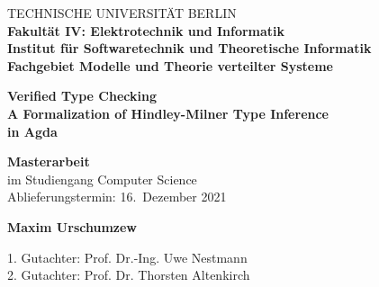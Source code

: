 \begin{titlepage}
%
\vspace*{1em}

\begin{center}%
\large {%
	TECHNISCHE UNIVERSITÄT BERLIN\\ 
  \vspace{0.5cm}
  \textbf{Fakultät IV: Elektrotechnik und Informatik}\\
	\textbf{Institut für Softwaretechnik und Theoretische Informatik}\\
	\textbf{Fachgebiet Modelle und Theorie verteilter Systeme}\\
}
\end{center}
\hfill

%
\vspace*{0.07\textheight}
%
\begin{center}
\huge { \textbf{Verified Type Checking} }\\
\vspace{0.8cm}
\Large{\textbf{A Formalization of Hindley-Milner Type Inference \\ in Agda}}
\end{center}
%
\vspace*{0.07\textheight}
%
\begin{center}
	\LARGE { \textbf{Masterarbeit} }\\
	\vspace*{1em}
	\Large im Studiengang Computer Science \\
  Ablieferungstermin: 16.\ Dezember 2021
\end{center}
%
\begin{center}
\vspace*{0.5em}
\vspace*{0.9em}
\end{center}
%
\begin{center}
\Large {\textbf{Maxim Urschumzew}} \\
\end{center}
%
\vspace*{0.05\textheight}

\begin{center}
  \Large
  1. Gutachter: Prof. Dr.-Ing. Uwe Nestmann \\
  2. Gutachter: Prof. Dr. Thorsten Altenkirch
\end{center}
%
\end{titlepage}

